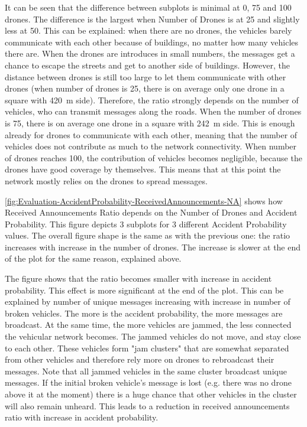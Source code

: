 \documentclass[]{nsm-thesis}
\begin{document}
It can be seen that the difference between subplots is minimal at 0, 75 and 100 drones. The difference is the largest when Number of Drones is at 25 and slightly less at 50. This can be explained: when there are no drones, the vehicles barely communicate with each other because of buildings, no matter how many vehicles there are. When the drones are introduces in small numbers, the messages get a chance to escape the streets and get to another side of buildings. However, the distance between drones is still too large to let them communicate with other drones (when number of drones is 25, there is on average only one drone in a square with \SI{420}{\meter} side). Therefore, the ratio strongly depends on the number of vehicles, who can transmit messages along the roads. When the number of drones is 75, there is on average one drone in a square with \SI{242}{\meter} side. This is enough already for drones to communicate with each other, meaning that the number of vehicles does not contribute as much to the network connectivity. When number of drones reaches 100, the contribution of vehicles becomes negligible, because the drones have good coverage by themselves. This means that at this point the network mostly relies on the drones to spread messages.

\cref{fig:Evaluation-AccidentProbability-ReceivedAnnouncements-NA} shows how Received Announcements Ratio depends on the Number of Drones and Accident Probability. This figure depicts 3 subplots for 3 different Accident Probability values. The overall figure shape is the same as with the previous one: the ratio increases with increase in the number of drones. The increase is slower at the end of the plot for the same reason, explained above. 

The figure shows that the ratio becomes smaller with increase in accident probability. This effect is more significant at the end of the plot. This can be explained by number of unique messages increasing with increase in number of broken vehicles. The more is the accident probability, the more messages are broadcast. At the same time, the more vehicles are jammed, the less connected the vehicular network becomes. The jammed vehicles do not move, and stay close to each other. These vehicles form "jam clusters" that are somewhat separated from other vehicles and therefore rely more on drones to rebroadcast their messages. Note that all jammed vehicles in the same cluster broadcast unique messages. If the initial broken vehicle's message is lost (e.g. there was no drone above it at the moment) there is a huge chance that other vehicles in the cluster will also remain unheard. This leads to a reduction in received announcements ratio with increase in accident probability.
\end{document}
